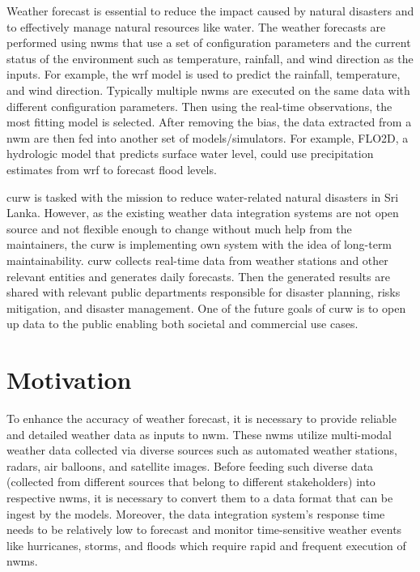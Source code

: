Weather forecast is essential to reduce the impact caused by natural disasters and to effectively manage natural resources like water.
The weather forecasts are performed using \acrfull{nwm}s that use a set of configuration parameters and the current status of the environment such as temperature, rainfall, and wind direction as the inputs. For example, the \acrfull{wrf} \cite{MesoscaleMicroscaleMeteorologyLaboratoryWeatherModel} model is used to predict the rainfall, temperature, and wind direction. Typically multiple \acrshort{nwm}s are executed on the same data with different configuration parameters. Then using the real-time observations, the most fitting model is selected. After removing the bias, the data extracted from a \acrshort{nwm} are then fed into another set of models/simulators. For example, FLO2D, a hydrologic model that predicts surface water level, could use precipitation estimates from \acrshort{wrf} to forecast flood levels.

\acrfull{curw} \cite{CUrWSL2017Lanka} is tasked with the mission to reduce water-related natural disasters in Sri Lanka. 
However, as the existing weather data integration systems are not open source and not flexible enough to change without much help from the maintainers, the \acrshort{curw} \cite{CUrWSLObservedSL} is implementing own system with the idea of long-term maintainability.
\acrshort{curw} collects real-time data from weather stations and other relevant entities and generates daily forecasts. Then the generated results are shared with relevant public departments responsible for disaster planning, risks mitigation, and disaster management. One of the future goals of \acrshort{curw} is to open up data to the public enabling both societal and commercial use cases.

\section{Motivation}
To enhance the accuracy of weather forecast, it is necessary to provide reliable and detailed weather data as inputs to \acrshort{nwm}. These \acrshort{nwm}s utilize multi-modal weather data collected via diverse sources such as automated weather stations, radars, air balloons, and satellite images. Before feeding such diverse data (collected from different sources that belong to different stakeholders) into respective \acrshort{nwm}s, it is necessary to convert them to a data format that can be ingest by the models. Moreover, the data integration system's response time needs to be relatively low to forecast and monitor time-sensitive weather events like hurricanes, storms, and floods which require rapid and frequent execution of \acrshort{nwm}s.

